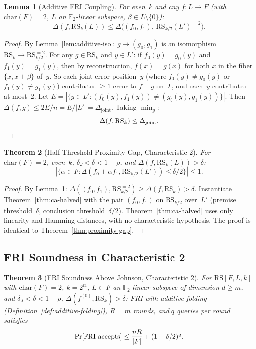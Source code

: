 \documentclass[11pt]{article}
\newtheorem{theorem}{Theorem}
\newtheorem{lemma}[theorem]{Lemma}
\newcommand{\FF}{\mathbb{F}}
\newcommand{\RS}{\mathrm{RS}}
\begin{document}
\begin{lemma}[Additive FRI Coupling]
\label{lem:additive-coupling}
For even~$k$ and any $f: L \to F$ (with $\mathrm{char}(F) = 2$, $L$ an $\FF_2$-linear subspace, $\beta \in L \setminus \{0\}$):
$$\Delta(f, \RS_k(L)) \leq \Delta\bigl((f_0, f_1),\, \RS_{k/2}(L')^{=2}\bigr).$$
\end{lemma}

\begin{proof}
By Lemma~\ref{lem:additive-iso}: $g \mapsto (g_0, g_1)$ is an isomorphism $\RS_k \to \RS_{k/2}^{=2}$. For any $g \in \RS_k$ and $y \in L'$: if $f_0(y) = g_0(y)$ and $f_1(y) = g_1(y)$, then by reconstruction, $f(x) = g(x)$ for both $x$ in the fiber $\{x, x{+}\beta\}$ of~$y$. So each joint-error position~$y$ (where $f_0(y) \neq g_0(y)$ or $f_1(y) \neq g_1(y)$) contributes $\geq 1$ error to $f - g$ on~$L$, and each~$y$ contributes at most~$2$. Let $E = |\{y \in L' : (f_0(y), f_1(y)) \neq (g_0(y), g_1(y))\}|$. Then $\Delta(f, g) \leq 2E/n = E/|L'| = \Delta_{\mathrm{joint}}$. Taking $\min_g$:
$$\Delta(f, \RS_k) \leq \Delta_{\mathrm{joint}}. \qedhere$$
\end{proof}

\begin{theorem}[Half-Threshold Proximity Gap, Characteristic 2]
\label{thm:proximity-gap-char2}
For $\mathrm{char}(F) = 2$, even~$k$, $\delta_J < \delta < 1{-}\rho$, and $\Delta(f, \RS_k(L)) > \delta$:
$$|\{\alpha \in F : \Delta(f_0 + \alpha f_1, \RS_{k/2}(L')) \leq \delta/2\}| \leq 1.$$
\end{theorem}

\begin{proof}
By Lemma~\ref{lem:additive-coupling}: $\Delta((f_0, f_1), \RS_{k/2}^{=2}) \geq \Delta(f, \RS_k) > \delta$. Instantiate Theorem~\ref{thm:ca-halved} with the pair $(f_0, f_1)$ on $\RS_{k/2}$ over~$L'$ (premise threshold~$\delta$, conclusion threshold~$\delta/2$). Theorem~\ref{thm:ca-halved} uses only linearity and Hamming distances, with no characteristic hypothesis. The proof is identical to Theorem~\ref{thm:proximity-gap}.
\end{proof}

\subsection{FRI Soundness in Characteristic 2}

\begin{theorem}[FRI Soundness Above Johnson, Characteristic 2]
\label{thm:fri-char2}
For $\RS[F, L, k]$ with $\mathrm{char}(F) = 2$, $k = 2^m$, $L \subset F$ an $\FF_2$-linear subspace of dimension $d \geq m$, and $\delta_J < \delta < 1{-}\rho$, $\Delta(f^{(0)}, \RS_k) > \delta$: FRI with additive folding (Definition~\ref{def:additive-folding}), $R = m$ rounds, and $q$ queries per round satisfies
$$\Pr[\textup{FRI accepts}] \leq \frac{nR}{|F|} + (1 - \delta/2)^q.$$
\end{theorem}
\end{document}
